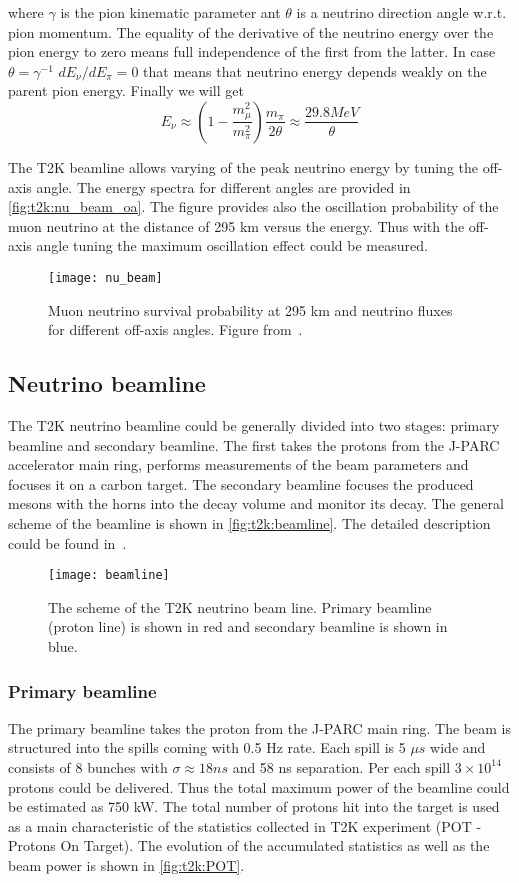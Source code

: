 \documentclass[../main.tex]{subfiles}
\begin{document}
where $\gamma$ is the pion kinematic parameter ant $\theta$ is a neutrino direction angle w.r.t. pion momentum. The equality of the derivative of the neutrino energy over the pion energy to zero means full independence of the first from the latter. In case $\theta=\gamma^{-1}$ $dE_\nu/dE_\pi=0$ that means that neutrino energy depends weakly on the parent pion energy. Finally we will get
\begin{equation}
E_\nu\approx\left(1-\frac{m_\mu^2}{m_\pi^2}\right)\frac{m_\pi}{2\theta}\approx\frac{29.8MeV}{\theta}
\end{equation}

The T2K beamline allows varying of the peak neutrino energy by tuning the off-axis angle. The energy spectra for different angles are provided in \autoref{fig:t2k:nu_beam_oa}. The figure provides also the oscillation probability of the muon neutrino at the distance of 295 km versus the energy. Thus with the off-axis angle tuning the maximum oscillation effect could be measured.
\begin{figure}[!ht]
  \centering
  \texttt{[image: nu\_beam]}
  \caption{Muon neutrino survival probability at 295 km and neutrino fluxes for different off-axis angles. Figure from~\cite{Abe2013}.}
  \label{fig:t2k:nu_beam_oa}
\end{figure}

\subsection{Neutrino beamline}
The T2K neutrino beamline could be generally divided into two stages: primary beamline and secondary beamline. The first takes the protons from the J-PARC accelerator main ring, performs measurements of the beam parameters and focuses it on a carbon target. The secondary beamline focuses the produced mesons with the horns into the decay volume and monitor its decay. The general scheme of the beamline is shown in \autoref{fig:t2k:beamline}. The detailed description could be found in~\cite{Abe2013}.

\begin{figure}[!ht]
  \centering
  \texttt{[image: beamline]}
  \caption{The scheme of the T2K neutrino beam line. Primary beamline (proton line) is shown in red and secondary beamline is shown in blue.}
  \label{fig:t2k:beamline}
\end{figure}

\subsubsection{Primary beamline}
The primary beamline takes the proton from the J-PARC main ring. The beam is structured into the spills coming with 0.5 Hz rate. Each spill is 5 $\mu s$ wide and consists of 8 bunches with $\sigma\approx18 ns$ and 58 ns separation. Per each spill $3\times10^{14}$ protons could be delivered. Thus the total maximum power of the beamline could be estimated as 750 kW. The total number of protons hit into the target is used as a main characteristic of the statistics collected in T2K experiment (POT - Protons On Target). The evolution of the accumulated statistics as well as the beam power is shown in \autoref{fig:t2k:POT}.
\end{document}

